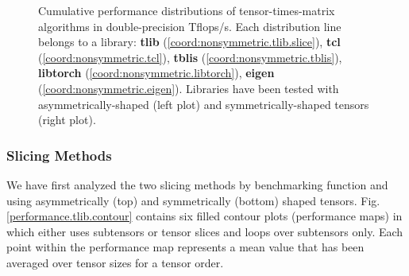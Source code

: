 \begin{figure*}[t]

\caption{ %
\footnotesize%
Cumulative performance distributions of tensor-times-matrix algorithms in double-precision Tflops/s.
Each distribution line belongs to a library:
\textbf{tlib} (\ref{coord:nonsymmetric.tlib.slice}), %
\textbf{tcl} (\ref{coord:nonsymmetric.tcl}), %
\textbf{tblis} (\ref{coord:nonsymmetric.tblis}), %
\textbf{libtorch} (\ref{coord:nonsymmetric.libtorch}), %
\textbf{eigen} (\ref{coord:nonsymmetric.eigen}).
Libraries have been tested with asymmetrically-shaped (left plot) and symmetrically-shaped tensors (right plot).
}
\label{fig:performance.comparison}
\end{figure*}



\subsubsection{Slicing Methods}
We have first analyzed the two slicing methods by benchmarking function  and  using asymmetrically (top) and symmetrically (bottom) shaped tensors.
Fig. \ref{performance.tlib.contour} contains six filled contour plots (performance maps) in which  either uses subtensors or tensor slices and  loops over subtensors only.
Each point within the performance map represents a mean value that has been averaged over tensor sizes for a tensor order.

